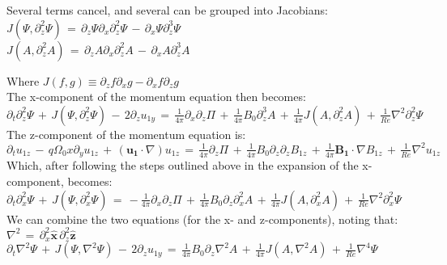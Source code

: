 \documentclass[letterpaper,12pt]{article}
\newcommand\reye{\mathrel{Re}}
\begin{document}
Several terms cancel, and several can be grouped into Jacobians: \\

$J\left(\Psi, \partial_z^2\Psi\right) \, = \, \partial_z \Psi \partial_x\partial_z^2\Psi \, - \, \partial_x\Psi\partial_z^3\Psi $ \\

$J\left(A, \partial_z^2 A\right) \, = \, \partial_z A \partial_x\partial_z^2A \, - \, \partial_xA\partial_z^3A $

Where $J\left(f, g\right) \equiv \partial_z f \partial_x g - \partial_x f \partial_z g$ \\ 

The x-component of the momentum equation then becomes: \\

$\partial_t\partial_z^2\Psi \, + \, J\left(\Psi, \partial_z^2\Psi\right) \, - \, 2\partial_z u_{1y} \, = \, \frac{1}{4\pi}\partial_x\partial_z\Pi \, + \, \frac{1}{4\pi}B_0 \partial_z^3A \, + \, \frac{1}{4\pi}J\left(A, \partial_z^2A\right) \, + \, \frac{1}{\reye}\nabla^2 \partial_z^2 \Psi$ \\

The z-component of the momentum equation is: \\

$\partial_t u_{1z} \, - \, q\Omega_0x\partial_y u_{1z} \, + \, \left(\mathbf{u_1} \cdot \nabla \right) u_{1z} \, = \, \frac{1}{4\pi}\partial_z \Pi \, + \, \frac{1}{4\pi} B_0 \partial_z\partial_zB_{1z} \, + \, \frac{1}{4\pi}\mathbf{B_1}\cdot\nabla B_{1z} \, + \, \frac{1}{\reye}\nabla^2 u_{1z} $ \\

Which, after following the steps outlined above in the expansion of the x-component, becomes: \\

$\partial_t \partial_x^2 \Psi \, + \, J\left(\Psi, \partial_x^2 \Psi\right) \, = \, -\frac{1}{4\pi}\partial_x\partial_z\Pi \, + \, \frac{1}{4\pi}B_0\partial_z\partial_x^2 A \, + \, \frac{1}{4\pi}J\left(A, \partial_x^2 A \right) \, + \, \frac{1}{\reye} \nabla^2 \partial_x^2 \Psi$ \\

We can combine the two equations (for the x- and z-components), noting that: \\

$\nabla^2 \, = \, \partial_x^2 \mathbf{\hat{x}} \, \partial_z^2 \mathbf{\hat{z}}$ \\

$\partial_t \nabla^2 \Psi \, + \, J\left(\Psi, \nabla^2 \Psi\right) \, - \, 2 \partial_z u_{1y} \, = \, \frac{1}{4\pi} B_0 \partial_z \nabla^2 A \, + \, \frac{1}{4\pi}J\left(A, \nabla^2 A \right) \, + \, \frac{1}{\reye}\nabla^4 \Psi$ \\
\end{document}
